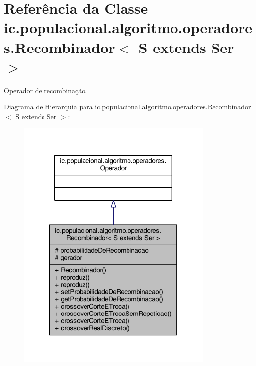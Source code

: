 \hypertarget{classic_1_1populacional_1_1algoritmo_1_1operadores_1_1_recombinador_3_01_s_01extends_01_ser_01_4}{\section{Referência da Classe ic.\-populacional.\-algoritmo.\-operadores.\-Recombinador$<$ S extends Ser $>$}
\label{classic_1_1populacional_1_1algoritmo_1_1operadores_1_1_recombinador_3_01_s_01extends_01_ser_01_4}
}


\hyperlink{classic_1_1populacional_1_1algoritmo_1_1operadores_1_1_operador}{Operador} de recombinação.  




Diagrama de Hierarquia para ic.\-populacional.\-algoritmo.\-operadores.\-Recombinador$<$ S extends Ser $>$\-:\nopagebreak
\begin{figure}[H]
\begin{center}
\leavevmode
\includegraphics[width=272pt]{classic_1_1populacional_1_1algoritmo_1_1operadores_1_1_recombinador_3_01_s_01extends_01_ser_01_4__inherit__graph}
\end{center}
\end{figure}


